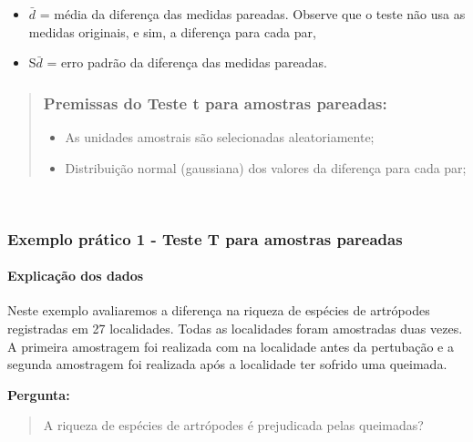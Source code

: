 \documentclass[
]{book}
\providecommand{\tightlist}{%
  \setlength{\itemsep}{0pt}\setlength{\parskip}{0pt}}
\begin{document}
\begin{itemize}
\item
  \(\bar{d}\) = média da diferença das medidas pareadas. Observe que o teste não usa as medidas originais, e sim, a diferença para cada par,
\item
  S\(\bar{d}\) = erro padrão da diferença das medidas pareadas.
\end{itemize}

\begin{quote}
\hypertarget{premissas-do-teste-t-para-amostras-pareadas}{%
\subsubsection{Premissas do Teste t para amostras pareadas:}\label{premissas-do-teste-t-para-amostras-pareadas}}

\begin{itemize}
\tightlist
\item
  As unidades amostrais são selecionadas aleatoriamente;
\item
  Distribuição normal (gaussiana) dos valores da diferença para cada par;
\end{itemize}
\end{quote}

~

\hypertarget{exemplo-pruxe1tico-1---teste-t-para-amostras-pareadas}{%
\subsubsection{Exemplo prático 1 - Teste T para amostras pareadas}\label{exemplo-pruxe1tico-1---teste-t-para-amostras-pareadas}}

\hypertarget{explicauxe7uxe3o-dos-dados-2}{%
\paragraph{Explicação dos dados}\label{explicauxe7uxe3o-dos-dados-2}}

Neste exemplo avaliaremos a diferença na riqueza de espécies de artrópodes registradas em 27 localidades. Todas as localidades foram amostradas duas vezes. A primeira amostragem foi realizada com na localidade antes da pertubação e a segunda amostragem foi realizada após a localidade ter sofrido uma queimada.

\textbf{Pergunta:}

\begin{quote}
A riqueza de espécies de artrópodes é prejudicada pelas queimadas?
\end{quote}
\end{document}
